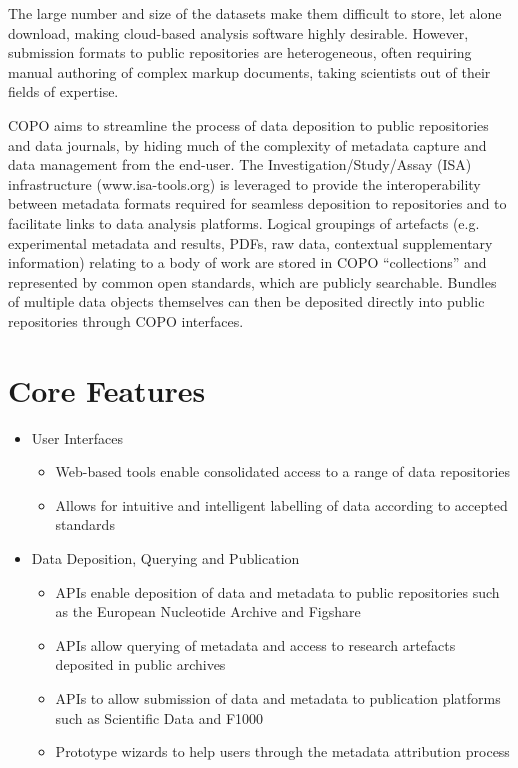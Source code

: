 \documentclass[runningheads,a4paper]{llncs}
\begin{document}
The large number and size of the datasets make them difficult to
store, let alone download, making cloud-based analysis software highly
desirable. However, submission formats to public repositories are
heterogeneous, often requiring manual authoring of complex markup
documents, taking scientists out of their fields of expertise.

COPO aims to streamline the process of data deposition to public
repositories and data journals, by hiding much of the complexity of
metadata capture and data management from the end-user. The
Investigation/Study/Assay (ISA) infrastructure (www.isa-tools.org) is
leveraged to provide the interoperability between metadata formats
required for seamless deposition to repositories and to facilitate
links to data analysis platforms. Logical groupings of artefacts
(e.g. experimental metadata and results, PDFs, raw data, contextual
supplementary information) relating to a body of work are stored in
COPO ``collections'' and represented by common open standards, which
are publicly searchable. Bundles of multiple data objects themselves
can then be deposited directly into public repositories through COPO
interfaces.

\vspace*{-0.2in}
\section{Core Features}
\vspace*{-0.1in}
\begin{itemize}
\item User Interfaces
  \begin{itemize}
  \item Web-based tools enable consolidated access to a range of data
    repositories
  \item Allows for intuitive and intelligent labelling of data
    according to accepted standards
  \end{itemize}
\item Data Deposition, Querying and Publication
  \begin{itemize}
  \item APIs enable deposition of data and metadata to public
    repositories such as the European Nucleotide Archive and Figshare
  \item APIs allow querying of metadata and access to research
    artefacts deposited in public archives
  \item APIs to allow submission of data and metadata to publication
    platforms such as Scientific Data and F1000
  \item Prototype wizards to help users through the metadata
    attribution process
  \end{itemize}
\end{itemize}
\end{document}
